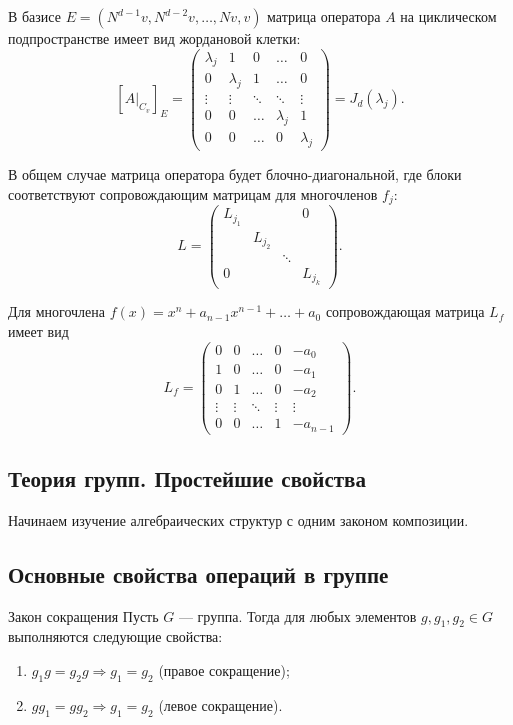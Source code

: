 В базисе $E = (N^{d-1}v, N^{d-2}v, \dots, Nv, v)$
матрица оператора $A$ на циклическом подпространстве имеет вид жордановой клетки:
\[
[A|_{C_v}]_E =
\begin{pmatrix}
	\lambda_j & 1 & 0 & \dots & 0 \\
	0 & \lambda_j & 1 & \dots & 0 \\
	\vdots & \vdots & \ddots & \ddots & \vdots \\
	0 & 0 & \dots & \lambda_j & 1 \\
	0 & 0 & \dots & 0 & \lambda_j
\end{pmatrix}
= J_d(\lambda_j).
\]

В общем случае матрица оператора будет блочно-диагональной, где блоки соответствуют сопровождающим матрицам для многочленов $f_j$:
\[
L =
\begin{pmatrix}
	L_{j_1} & & & 0 \\
	& L_{j_2} & & \\
	& & \ddots & \\
	0 & & & L_{j_k}
\end{pmatrix}.
\]

Для многочлена $f(x) = x^n + a_{n-1}x^{n-1} + \dots + a_0$
сопровождающая матрица $L_f$ имеет вид
\[
L_f =
\begin{pmatrix}
	0 & 0 & \dots & 0 & -a_0 \\
	1 & 0 & \dots & 0 & -a_1 \\
	0 & 1 & \dots & 0 & -a_2 \\
	\vdots & \vdots & \ddots & \vdots & \vdots \\
	0 & 0 & \dots & 1 & -a_{n-1}
\end{pmatrix}.
\]

\subsection{Теория групп. Простейшие свойства}

Начинаем изучение алгебраических структур с одним законом композиции.

\subsection{Основные свойства операций в группе}

\begin{Proposition}{Закон сокращения}{}
	Пусть $G$ — группа. Тогда для любых элементов $g,g_1,g_2 \in G$ выполняются следующие свойства:
	\begin{enumerate}
		\item $g_1g = g_2g \Rightarrow g_1 = g_2$ \quad (правое сокращение);
		\item $gg_1 = gg_2 \Rightarrow g_1 = g_2$ \quad (левое сокращение).
	\end{enumerate}
\end{Proposition}

